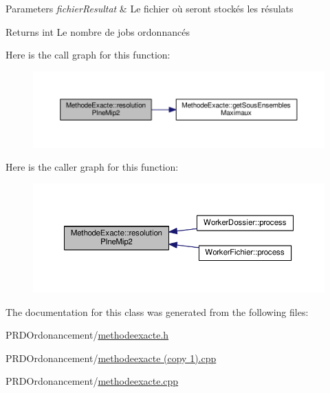 \begin{DoxyParams}{Parameters}
{\em fichier\+Resultat} & Le fichier où seront stockés les résulats \\
\hline
\end{DoxyParams}
\begin{DoxyReturn}{Returns}
int Le nombre de jobs ordonnancés 
\end{DoxyReturn}
Here is the call graph for this function\+:\nopagebreak
\begin{figure}[H]
\begin{center}
\leavevmode
\includegraphics[width=350pt]{classMethodeExacte_ae3a50fe055b468baa284287ba61ba381_cgraph}
\end{center}
\end{figure}
Here is the caller graph for this function\+:\nopagebreak
\begin{figure}[H]
\begin{center}
\leavevmode
\includegraphics[width=350pt]{classMethodeExacte_ae3a50fe055b468baa284287ba61ba381_icgraph}
\end{center}
\end{figure}


The documentation for this class was generated from the following files\+:\begin{DoxyCompactItemize}
\item 
P\+R\+D\+Ordonancement/\hyperlink{methodeexacte_8h}{methodeexacte.\+h}\item 
P\+R\+D\+Ordonancement/\hyperlink{methodeexacte_01_07copy_011_08_8cpp}{methodeexacte (copy 1).\+cpp}\item 
P\+R\+D\+Ordonancement/\hyperlink{methodeexacte_8cpp}{methodeexacte.\+cpp}\end{DoxyCompactItemize}
